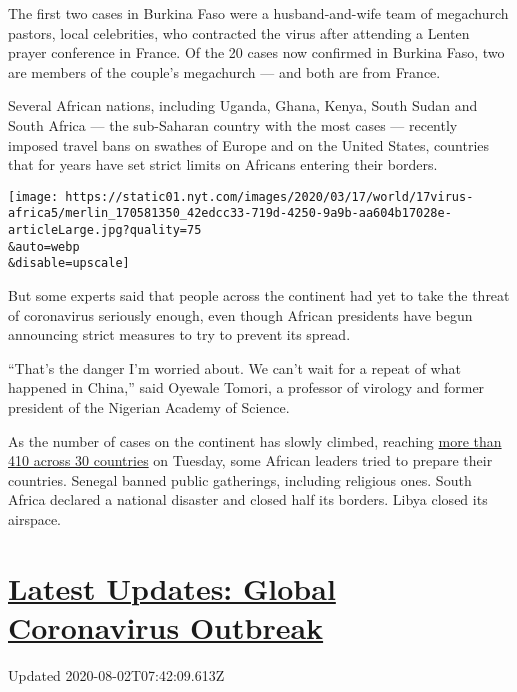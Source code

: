 The first two cases in Burkina Faso were a husband-and-wife team of
megachurch pastors, local celebrities, who contracted the virus after
attending a Lenten prayer conference in France. Of the 20 cases now
confirmed in Burkina Faso, two are members of the couple's megachurch
--- and both are from France.

Several African nations, including Uganda, Ghana, Kenya, South Sudan and
South Africa --- the sub-Saharan country with the most cases ---
recently imposed travel bans on swathes of Europe and on the United
States, countries that for years have set strict limits on Africans
entering their borders.

\texttt{[image: https://static01.nyt.com/images/2020/03/17/world/17virus-africa5/merlin\_170581350\_42edcc33-719d-4250-9a9b-aa604b17028e-articleLarge.jpg?quality=75\\\&auto=webp\\\&disable=upscale]}

But some experts said that people across the continent had yet to take
the threat of coronavirus seriously enough, even though African
presidents have begun announcing strict measures to try to prevent its
spread.

``That's the danger I'm worried about. We can't wait for a repeat of
what happened in China,'' said Oyewale Tomori, a professor of virology
and former president of the Nigerian Academy of Science.

As the number of cases on the continent has slowly climbed, reaching
\href{https://twitter.com/WHOAFRO}{more than 410 across 30 countries} on
Tuesday, some African leaders tried to prepare their countries. Senegal
banned public gatherings, including religious ones. South Africa
declared a national disaster and closed half its borders. Libya closed
its airspace.

\hypertarget{latest-updates-global-coronavirus-outbreak}{%
\section{\texorpdfstring{\href{https://www.nytimes.com/2020/08/01/world/coronavirus-covid-19.html?action=click\&pgtype=Article\&state=default\&region=MAIN_CONTENT_1\&context=storylines_live_updates}{Latest
Updates: Global Coronavirus
Outbreak}}{Latest Updates: Global Coronavirus Outbreak}}\label{latest-updates-global-coronavirus-outbreak}}

Updated 2020-08-02T07:42:09.613Z

